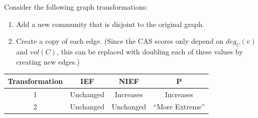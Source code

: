 \documentclass{beamer}
\begin{document}
\begin{frame}{}
Consider the following graph transformations:
    \begin{enumerate}
        \color{darkblue}
        \item Add a new community that is disjoint to the original graph.
        \item Create a copy of each edge. (Since the CAS scores only depend on $deg_C(v)$ and $vol(C)$, this can be replaced with doubling each of these values by creating new edges.)
    \end{enumerate}
    \vspace{1em}
    \begin{table}
        \centering
        \begin{tabular}{c|c|c|c}
            Transformation & IEF & NIEF & P\\ \hline
            1 & Unchanged & Increases & Increases \\
            2 & Unchanged & Unchanged & ``More Extreme''
        \end{tabular}
    \end{table}
\end{frame}

\subtitle{Applications}
\end{document}
